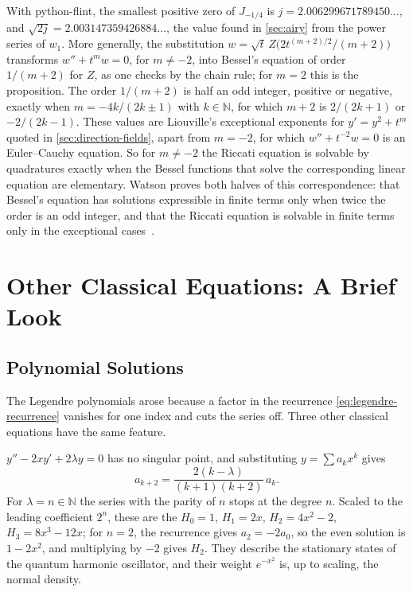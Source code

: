 With python-flint, the smallest positive zero of $J_{-1/4}$ is $j=2.006299671789450\ldots$, and $\sqrt{2j}=2.003147359426884\ldots$, the value found in \cref{sec:airy} from the power series of $w_1$. More generally, the substitution $w=\sqrt t\,Z\bigl(2t^{(m+2)/2}/(m+2)\bigr)$ transforms $w''+t^mw=0$, for $m\ne-2$, into Bessel's equation of order $1/(m+2)$ for $Z$, as one checks by the chain rule; for $m=2$ this is the proposition. The order $1/(m+2)$ is half an odd integer, positive or negative, exactly when $m=-4k/(2k\pm1)$ with $k\in\mathbb N$, for which $m+2$ is $2/(2k+1)$ or $-2/(2k-1)$. These values are Liouville's exceptional exponents for $y'=y^2+t^m$ quoted in \cref{sec:direction-fields}, apart from $m=-2$, for which $w''+t^{-2}w=0$ is an Euler--Cauchy equation. So for $m\ne-2$ the Riccati equation is solvable by quadratures exactly when the Bessel functions that solve the corresponding linear equation are elementary. Watson proves both halves of this correspondence: that Bessel's equation has solutions expressible in finite terms only when twice the order is an odd integer, and that the Riccati equation is solvable in finite terms only in the exceptional cases~\cite[Chap.~IV]{watson1944}.

\section{Other Classical Equations: A Brief Look}
\label{sec:classical-equations}

\subsection{Polynomial Solutions}

The Legendre polynomials arose because a factor in the recurrence \eqref{eq:legendre-recurrence} vanishes for one index and cuts the series off. Three other classical equations have the same feature.

 $y''-2xy'+2\lambda y=0$ has no singular point, and substituting $y=\sum a_kx^k$ gives
\[
a_{k+2}=\frac{2(k-\lambda)}{(k+1)(k+2)}\,a_k .
\]
For $\lambda=n\in\mathbb N$ the series with the parity of $n$ stops at the degree $n$. Scaled to the leading coefficient $2^n$, these are the  $H_0=1$, $H_1=2x$, $H_2=4x^2-2$, $H_3=8x^3-12x$; for $n=2$, the recurrence gives $a_2=-2a_0$, so the even solution is $1-2x^2$, and multiplying by $-2$ gives $H_2$. They describe the stationary states of the quantum harmonic oscillator, and their weight $e^{-x^2}$ is, up to scaling, the normal density.

